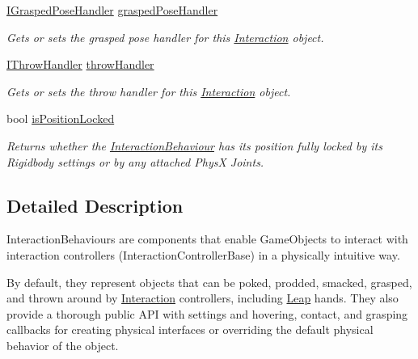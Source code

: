 \begin{DoxyCompactItemize}
\mbox{\hyperlink{interface_leap_1_1_unity_1_1_interaction_1_1_i_grasped_pose_handler}{I\+Grasped\+Pose\+Handler}} \mbox{\hyperlink{class_leap_1_1_unity_1_1_interaction_1_1_interaction_behaviour_a151860870ac9b7aaf9b81d1a11e9c3cf}{grasped\+Pose\+Handler}}
\begin{DoxyCompactList}\small\item\em Gets or sets the grasped pose handler for this \mbox{\hyperlink{namespace_leap_1_1_unity_1_1_interaction}{Interaction}} object. \end{DoxyCompactList}\item 
\mbox{\hyperlink{interface_leap_1_1_unity_1_1_interaction_1_1_i_throw_handler}{I\+Throw\+Handler}} \mbox{\hyperlink{class_leap_1_1_unity_1_1_interaction_1_1_interaction_behaviour_a3b24ac497fcbece385d43065bdaee230}{throw\+Handler}}
\begin{DoxyCompactList}\small\item\em Gets or sets the throw handler for this \mbox{\hyperlink{namespace_leap_1_1_unity_1_1_interaction}{Interaction}} object. \end{DoxyCompactList}\item 
bool \mbox{\hyperlink{class_leap_1_1_unity_1_1_interaction_1_1_interaction_behaviour_aa2fe2de792e74492e4eb4079aacd3b6e}{is\+Position\+Locked}}
\begin{DoxyCompactList}\small\item\em Returns whether the \mbox{\hyperlink{class_leap_1_1_unity_1_1_interaction_1_1_interaction_behaviour}{Interaction\+Behaviour}} has its position fully locked by its Rigidbody settings or by any attached PhysX Joints. \end{DoxyCompactList}\end{DoxyCompactItemize}


\subsection{Detailed Description}
Interaction\+Behaviours are components that enable Game\+Objects to interact with interaction controllers (Interaction\+Controller\+Base) in a physically intuitive way. 

By default, they represent objects that can be poked, prodded, smacked, grasped, and thrown around by \mbox{\hyperlink{namespace_leap_1_1_unity_1_1_interaction}{Interaction}} controllers, including \mbox{\hyperlink{namespace_leap_1_1_unity_1_1_leap}{Leap}} hands. They also provide a thorough public A\+PI with settings and hovering, contact, and grasping callbacks for creating physical interfaces or overriding the default physical behavior of the object.

